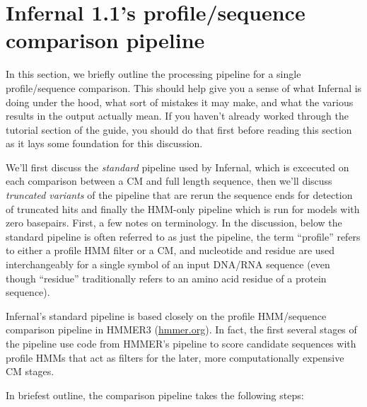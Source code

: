 \section{Infernal 1.1's profile/sequence comparison pipeline}
\label{section:pipeline}
\setcounter{footnote}{0}

In this section, we briefly outline the processing pipeline for a
single profile/sequence comparison. This should help give you a sense
of what Infernal is doing under the hood, what sort of mistakes it may
make, and what the various results in the output actually mean. If you
haven't already worked through the tutorial section of the guide, you
should do that first before reading this section as it lays some
foundation for this discussion.

We'll first discuss the \emph{standard} pipeline used by Infernal,
which is excecuted on each comparison between a CM and full length
sequence, then we'll discuss \emph{truncated variants} of the pipeline
that are rerun the sequence ends for detection of truncated hits and
finally the HMM-only pipeline which is run for models with zero
basepairs.  First, a few notes on terminology. In the discussion,
below the standard pipeline is often referred to as just the pipeline,
the term ``profile'' refers to either a profile HMM filter or a CM,
and nucleotide and residue are used interchangeably for a single
symbol of an input DNA/RNA sequence (even though ``residue''
traditionally refers to an amino acid residue of a protein sequence).

Infernal's standard pipeline is based closely on the profile
HMM/sequence comparison pipeline in HMMER3 (\url{hmmer.org}). In fact,
the first several stages of the pipeline use code from HMMER's
pipeline to score candidate sequences with profile HMMs that act as
filters for the later, more computationally expensive CM stages.

In briefest outline, the comparison pipeline takes the following
steps:

